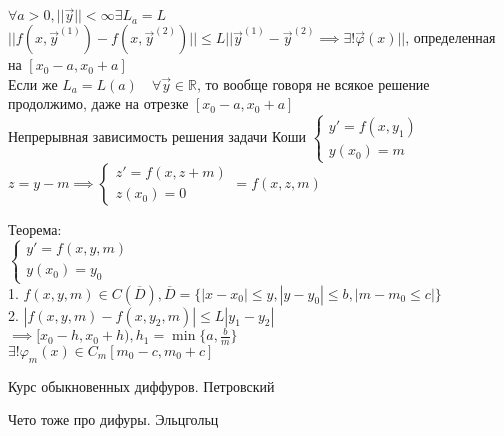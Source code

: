\documentclass[12pt, a4paper]{article}
\begin{document}
$\forall a >0, ||\vec{y}|| < \infty \exists L_a = L$\\

$||f(x, \vec{y}^{(1)}) - f(x, \vec{y}^{(2)})|| \le L || \vec{y}^{(1)} - \vec{y}^{(2)} \implies \exists! \vec{\varphi}(x)||$, определенная на $[x_0 -a, x_0 + a]$\\

Если же $L_a = L(a) \quad \forall \vec{y} \in \mathbb{R}$, то вообще говоря не всякое решение продолжимо, даже на отрезке $[x_0-a, x_0+a]$ \\


Непрерывная зависимость решения задачи Коши
$
\left\{
\begin{matrix}
y' = f(x, y_1) \\
y(x_0) = m
 
\end{matrix}
\right.
$\\
$ z = y - m \implies \left\{
\begin{matrix}
z' = f(x, z+m) \\ z(x_0) = 0
\end{matrix} \right.
 = f(x,z,m)
$ 

Теорема:\\

$\left\{
\begin{matrix}
y' = f(x, y, m)\\ y(x_0) = y_0
\end{matrix}\right.
$\\

1. $f(x,y,m) \in C(\overline{D}), \overline{D} = \{ |x-x_0| \le y, |y-y_0| \le b, |m - m_0 \le c| \} $\\
2. $|f(x,y,m) - f(x,y_2,m)| \le L|y_1 - y_2|$\\
$\implies [x_0 - h, x_0 + h), h_1 = \min\{a, \frac{b}{m}\}$\\
$\exists!\varphi_m(x) \in C_m[m_0-c, m_0+c]$\\

\begin{list}{•}{Литература:}
\item Курс обыкновенных диффуров. Петровский
\item Чето тоже про дифуры. Эльцгольц
\end{list}
 
 
\end{document}
